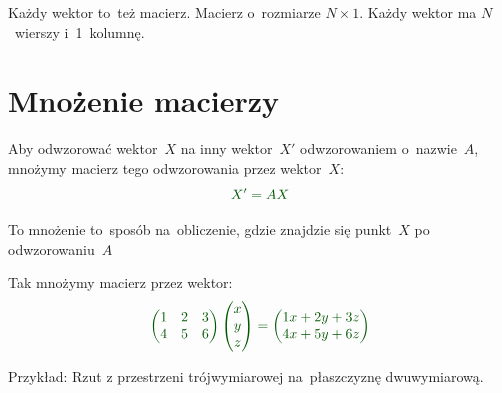 \documentclass{beamer}
\begin{document}
  \begin{frame}
    Każdy wektor to~też macierz. Macierz o~rozmiarze $N \times 1$.
    Każdy wektor ma $N$~wierszy i~1~kolumnę.
  \end{frame}

  \section{Mnożenie macierzy}

  \begin{frame}
    Aby odwzorować wektor~$X$ na inny wektor~$X'$ odwzorowaniem
    o~nazwie~$A$, mnożymy macierz tego odwzorowania przez wektor~$X$:
    $$\g
    X' = AX
    $$

    To mnożenie to~sposób na~obliczenie, gdzie znajdzie się
    punkt~$X$ po odwzorowaniu~$A$
  \end{frame}

  \begin{frame}
    Tak mnożymy macierz przez wektor:
    $$\g
    \begin{pmatrix}
      1 & 2 & 3 \\
      4 & 5 & 6
    \end{pmatrix}
    \begin{pmatrix}
      x \\
      y \\
      z
    \end{pmatrix} =
    \begin{pmatrix}
      1x + 2y + 3z \\
      4x + 5y + 6z
    \end{pmatrix}
    $$
  \end{frame}

  \begin{frame}
    Przykład: Rzut z przestrzeni trójwymiarowej na~płaszczyznę
    dwuwymiarową.
  \end{frame}
\end{document}
